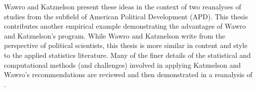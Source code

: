 Wawro and Katznelson present these ideas in the context of two reanalyses of studies from the subfield of American Political Development (APD). This thesis contributes another empirical example demonstrating the advantages of Wawro and Katznelson's program. While Wawro and Katznelson write from the perspective of political scientists, this thesis is more similar in content and style to the applied statistics literature. Many of the finer details of the statistical and computational methods (and challenges) involved in applying Katznelson and Wawro's recommendations are reviewed and then demonstrated in a reanalysis of . 



